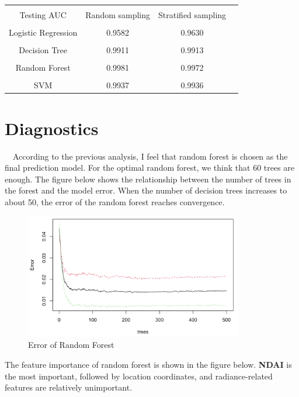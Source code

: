 \documentclass[11pt]{article}
\begin{document}
\begin{table}[htbp]
\centering
	\begin{tabular}{|c|c|c|c|}  
		\hline  
		& &  \\[-8pt]  
		Testing AUC&Random sampling&Stratified sampling \\ 
		\hline
		& &  \\[-8pt] 
		Logistic Regression&0.9582 &0.9630  \\
		\hline
		& &  \\[-8pt] 
		Decision Tree&0.9911 &0.9913  \\
		\hline
		& &  \\[-8pt] 
		Random Forest&0.9981 &0.9972 \\
		\hline
		& &  \\[-8pt] 
		SVM	&0.9937 &0.9936  \\
		\hline
	\end{tabular}
\end{table}

\section{Diagnostics}

\quad\ \ According to the previous analysis, I feel that random forest is chosen as the final prediction model. For the optimal random forest, we think that 60 trees are enough. The figure below shows the relationship between the number of trees in the forest and the model error. When the number of decision trees increases to about 50, the error of the random forest reaches convergence.

\begin{figure}[H]
  \centering
      \includegraphics[width=0.85\textwidth, height=0.45\textwidth]{../figures/RF.png}    
  \caption{Error of Random Forest}
\end{figure}

The feature importance of random forest is shown in the figure below. \textbf{NDAI} is the most important, followed by location coordinates, and radiance-related features are relatively unimportant.
\end{document}
